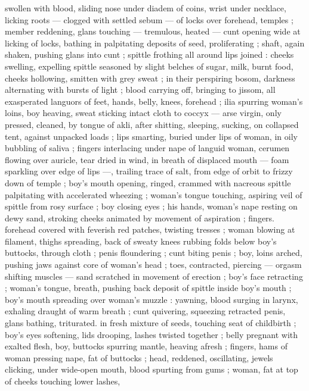 swollen with blood, sliding nose under diadem of coins, wrist under 
necklace, licking roots --- clogged with settled sebum --- of locks 
over forehead, temples ; member reddening, glans touching --- 
tremulous, heated --- cunt opening wide at licking of locks, bathing 
in palpitating deposits of seed, proliferating ; shaft, again shaken, 
pushing glans into cunt ; spittle frothing all around lips joined : 
cheeks swelling, expelling spittle seasoned by slight belches of 
sugar, milk, burnt food, cheeks hollowing, smitten with grey sweat ; 
in their perspiring bosom, darkness alternating with bursts of light ; 
blood carrying off, bringing to jissom, all exasperated languors of 
feet, hands, belly, knees, forehead ; ilia spurring woman's loins, boy 
heaving, sweat sticking intact cloth to coccyx --- arse virgin, only 
pressed, cleaned, by tongue of akli, after shitting, sleeping, sucking, 
on collapsed tent, against unpacked loads ; lips smarting, buried 
under lips of woman, in oily bubbling of saliva ; fingers interlacing 
under nape of languid woman, cerumen flowing over auricle, tear 
dried in wind, in breath of displaced mouth --- foam sparkling over 
edge of lips ---, trailing trace of salt, from edge of orbit to frizzy 
down of temple ; boy's mouth opening, ringed, crammed with 
nacreous spittle palpitating with accelerated wheezing ; woman's 
tongue touching, aspiring veil of spittle from rosy surface ; boy 
closing eyes ; his hands, woman's nape resting on dewy sand, 
stroking cheeks animated by movement of aspiration ; fingers. 
forehead covered with feverish red patches, twisting tresses ; woman 
blowing at filament, thighs spreading, back of sweaty knees rubbing 
folds below boy's buttocks, through cloth ; penis floundering ; cunt 
biting penis ; boy, loins arched, pushing jaws against core of 
woman's head ; toes, contracted, piercing --- orgasm shifting 
muscles --- sand scratched in movement of erection ; boy's face 
retracting ; woman's tongue, breath, pushing back deposit of spittle 
inside boy's mouth ; boy's mouth spreading over woman's muzzle : 
yawning, blood surging in larynx, exhaling draught of warm breath ; 
cunt quivering, squeezing retracted penis, glans bathing, triturated. 
in fresh mixture of seeds, touching seat of childbirth ; boy's eyes 
softening, lids drooping, lashes twisted together ; belly pregnant with 
exalted flesh, boy, buttocks spurring mantle, heaving afresh ; fingers, 
hams of woman pressing nape, fat of buttocks ; head, reddened, 
oscillating, jewels clicking, under wide-open mouth, blood spurting 
from gums ; woman, fat at top of cheeks touching lower lashes, 
